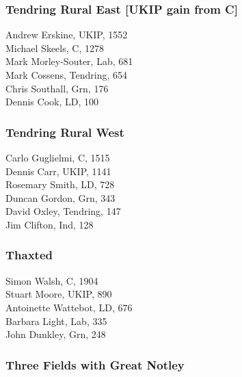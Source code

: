 \documentclass[a4paper,openany,10pt]{book}
\begin{document}
\subsubsection*{Tendring Rural East \hspace*{\fill}\nolinebreak[1]%
\enspace\hspace*{\fill}
[UKIP gain from C]}



Andrew Erskine, UKIP, 1552\\
Michael Skeels, C, 1278\\
{Mark Morley-Souter}, Lab, 681\\
Mark Cossens, Tendring, 654\\
Chris Southall, Grn, 176\\
Dennis Cook, LD, 100\\


\subsubsection*{Tendring Rural West}



Carlo Guglielmi, C, 1515\\
Dennis Carr, UKIP, 1141\\
Rosemary Smith, LD, 728\\
Duncan Gordon, Grn, 343\\
David Oxley, Tendring, 147\\
Jim Clifton, Ind, 128\\


\subsubsection*{Thaxted}



Simon Walsh, C, 1904\\
Stuart Moore, UKIP, 890\\
Antoinette Wattebot, LD, 676\\
Barbara Light, Lab, 335\\
John Dunkley, Grn, 248\\


\subsubsection*{Three Fields with Great Notley}
\end{document}
